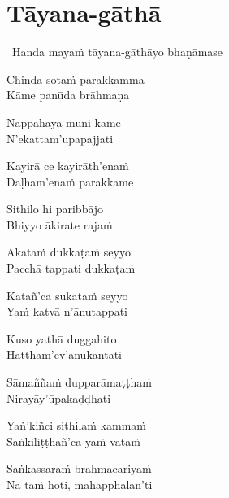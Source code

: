 
\section{Tāyana-gāthā}
\label{tayana-gatha}

\begin{intro}
	\anglebracketleft\ \hspace{-0.5mm}Handa mayaṁ tāyana-gāthāyo bhaṇāmase \hspace{-0.5mm}\anglebracketright\
\end{intro}

\medskip

\begin{pali-hang}
Chinda sotaṁ parakkamma\\
Kāme panūda brāhmaṇa
\end{pali-hang}
\begin{pali-hang}
Nappahāya muni kāme\\
N'ekattam'upapajjati
\end{pali-hang}
\begin{pali-hang}
Kayirā ce kayirāth'enaṁ\\
Daḷham'enaṁ parakkame
\end{pali-hang}
\begin{pali-hang}
Sithilo hi paribbājo\\
Bhiyyo ākirate rajaṁ
\end{pali-hang}
\begin{pali-hang}
Akataṁ dukkaṭaṁ seyyo\\
Pacchā tappati dukkaṭaṁ
\end{pali-hang}
\begin{pali-hang}
Katañ'ca sukataṁ seyyo\\
Yaṁ katvā n'ānutappati
\end{pali-hang}
\begin{pali-hang}
Kuso yathā duggahito\\
Hattham'ev'ānukantati
\end{pali-hang}
\begin{pali-hang}
Sāmaññaṁ dupparāmaṭṭhaṁ\\
Nirayāy'ūpakaḍḍhati
\end{pali-hang}
\begin{pali-hang}
Yaṅ'kiñci sithilaṁ kammaṁ\\
Saṅkiliṭṭhañ'ca yaṁ vataṁ
\end{pali-hang}
\begin{pali-hang}
Saṅkassaraṁ brahmacariyaṁ\\
Na taṁ hoti, mahapphalan'ti
\end{pali-hang}

\clearpage


